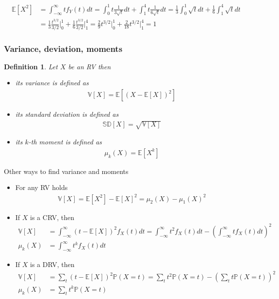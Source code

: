 \documentclass[10pt]{article}
\newtheorem*{definition}{Definition}
\begin{document}
\begin{align}
\mathbb{E}[X^2]
&=\int_{-\infty}^{\infty} t f_Y(t)dt
=\int_0^1 t\frac{1}{3\sqrt{t}}dt+\int_1^4 t\frac{1}{6\sqrt{t}}dt
=\frac{1}{3}\int_0^1 \sqrt{t}dt+\frac{1}{6}\int_1^4 \sqrt{t}dt\\
&=\frac{1}{3}\frac{t^{3/2}}{3/2}\Biggl|_0^1 +\frac{1}{6}\frac{t^{3/2}}{3/2}\Biggl|_1^4
=\frac{2}{9}t^{3/2}\Biggl|_0^1 +\frac{2}{18}t^{3/2}\Biggl|_1^4 
=1
\end{align}

\subsubsection{Variance, deviation, moments}

\begin{definition}
Let $X$ be an RV then
\begin{itemize}
\item its variance is defined as
\begin{align}
\mathbb{V}[X]=\mathbb{E}[(X-\mathbb{E}[X])^2]
\end{align}
\item its standard deviation is defined as
\begin{align}
\mathbb{SD}[X]=\sqrt{\mathbb{V}[X]}
\end{align}
\item its $k$-th moment is defined as
\begin{align}
\mu_k(X)=\mathbb{E}[X^k]
\end{align}
\end{itemize}
\end{definition}

Other ways to find variance and moments

\begin{itemize}
\item For any RV holds
\begin{align}
\mathbb{V}[X]=\mathbb{E}[X^2]-\mathbb{E}[X]^2=\mu_2(X)-\mu_1(X)^2
\end{align}
\item If $X$ is a CRV, then
\begin{align}
\mathbb{V}[X]
&=\int_{-\infty}^\infty(t-\mathbb{E}[X])^2f_X(t)dt
=\int_{-\infty}^\infty t^2 f_X(t)dt-\left(\int_{-\infty}^\infty t f_X(t)dt\right)^2\\
\mu_k(X)&=\int_{-\infty}^\infty t^k f_X(t)dt
\end{align}
\item If $X$ is a DRV, then
\begin{align}
\mathbb{V}[X]
&=\sum_t (t-\mathbb{E}[X])^2\mathbb{P}(X=t)
=\sum_t t^2 \mathbb{P}(X=t)-\left(\sum_t t \mathbb{P}(X=t)\right)^2\\
\mu_k(X)&=\sum_t t^k \mathbb{P}(X=t)
\end{align}
\end{itemize}
\end{document}
